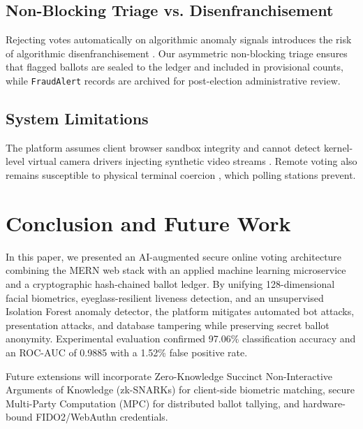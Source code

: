 \documentclass[conference]{IEEEtran}
\begin{document}
\subsection{Non-Blocking Triage vs. Disenfranchisement}
Rejecting votes automatically on algorithmic anomaly signals introduces the risk of algorithmic disenfranchisement \cite{eubanks2018automating}. Our asymmetric non-blocking triage ensures that flagged ballots are sealed to the ledger and included in provisional counts, while \texttt{FraudAlert} records are archived for post-election administrative review.

\subsection{System Limitations}
The platform assumes client browser sandbox integrity and cannot detect kernel-level virtual camera drivers injecting synthetic video streams \cite{mirsky2021creation}. Remote voting also remains susceptible to physical terminal coercion \cite{chaum2004secret}, which polling stations prevent.

\section{Conclusion and Future Work}
In this paper, we presented an AI-augmented secure online voting architecture combining the MERN web stack with an applied machine learning microservice and a cryptographic hash-chained ballot ledger. By unifying 128-dimensional facial biometrics, eyeglass-resilient liveness detection, and an unsupervised Isolation Forest anomaly detector, the platform mitigates automated bot attacks, presentation attacks, and database tampering while preserving secret ballot anonymity. Experimental evaluation confirmed 97.06\% classification accuracy and an ROC-AUC of 0.9885 with a 1.52\% false positive rate.

Future extensions will incorporate Zero-Knowledge Succinct Non-Interactive Arguments of Knowledge (zk-SNARKs) \cite{bensasson2014succinct} for client-side biometric matching, secure Multi-Party Computation (MPC) \cite{cramer2015secure} for distributed ballot tallying, and hardware-bound FIDO2/WebAuthn credentials.



\end{document}
